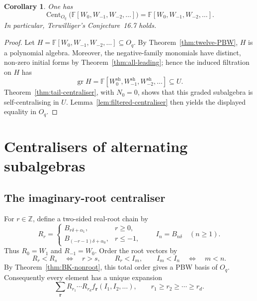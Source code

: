 \documentclass[11pt]{extarticle}
\newtheorem{corollary}[theorem]{Corollary}
\theoremstyle{definition}
\theoremstyle{remark}
\numberwithin{equation}{section}
\newcommand{\F}{\mathbb F}
\newcommand{\Z}{\mathbb Z}
\newcommand{\Oq}{O_q}
\newcommand{\gr}{\operatorname{gr}}
\newcommand{\sh}{\mathrm{sh}}
\DeclareMathOperator{\Cent}{Cent}
\begin{document}
\begin{corollary}
\label{cor:conj167}
One has
\[
 \Cent_{\Oq}\bigl(\F[W_0,W_{-1},W_{-2},\ldots]\bigr)
 =\F[W_0,W_{-1},W_{-2},\ldots].
\]
In particular, Terwilliger's Conjecture~16.7 holds.
\end{corollary}

\begin{proof}
Let $H=\F[W_0,W_{-1},W_{-2},\ldots]\subseteq\Oq$.  By
Theorem~\ref{thm:twelve-PBW}, $H$ is a polynomial algebra.  Moreover,
the negative-family monomials have distinct, non-zero initial forms by
Theorem~\ref{thm:all-leading}; hence the induced filtration on $H$ has
\[
 \gr H=\F[W_0^{\sh},W_{-1}^{\sh},W_{-2}^{\sh},\ldots]\subseteq U.
\]
Theorem~\ref{thm:tail-centraliser}, with $N_0=0$, shows that this graded
subalgebra is self-centralising in $U$.  Lemma~\ref{lem:filtered-centraliser}
then yields the displayed equality in $\Oq$.
\end{proof}


\section{Centralisers of alternating subalgebras}
\label{sec:centralisers}

\subsection{The imaginary-root centraliser}

For $r\in\Z$, define a two-sided real-root chain by
\[
 R_r=
 \begin{cases}
 B_{r\delta+\alpha_1}, & r\geq0,\\[1mm]
 B_{(-r-1)\delta+\alpha_0}, & r\leq-1,
 \end{cases}
 \qquad
 I_n=B_{n\delta}\quad(n\geq1).
\]
Thus $R_0=W_1$ and $R_{-1}=W_0$.  Order the root vectors by
\begin{equation}
\label{eq:BK-centraliser-order}
 R_r<R_s\quad\Longleftrightarrow\quad r>s,
 \qquad R_r<I_m,
 \qquad I_m<I_n\quad\Longleftrightarrow\quad m<n.
\end{equation}
By Theorem~\ref{thm:BK-nonroot}, this total order gives a PBW basis of
$\Oq$.  Consequently every element has a unique expansion
\begin{equation}
\label{eq:BK-centraliser-expansion}
 \sum_{\boldsymbol r}
 R_{r_1}\cdots R_{r_d}
 f_{\boldsymbol r}(I_1,I_2,\ldots),
 \qquad r_1\geq r_2\geq\cdots\geq r_d.
\end{equation}
\end{document}
